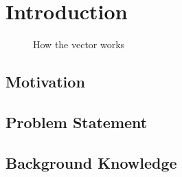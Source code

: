 \chapter{Introduction}
\label{sec:introduction}

\begin{figure}
  \begin{center}
    
    \caption{How the vector works}
  \end{center}
\end{figure}

\section{Motivation}
\label{sec:introduction:motivation}


\section{Problem Statement}
\label{sec:introduction:problemStatement}


\section{Background Knowledge}
\label{sec:introduction:backgroundKnowledge}
